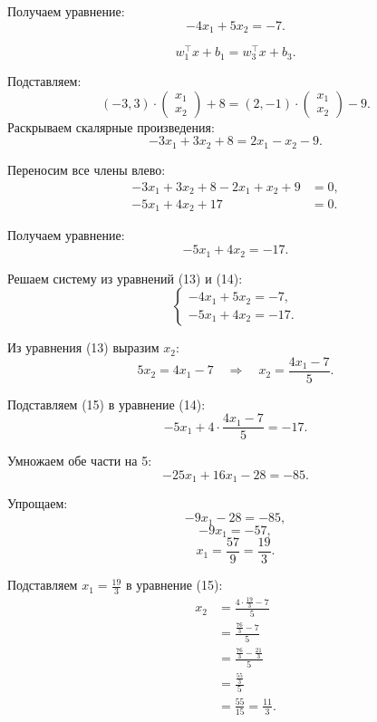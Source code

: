 \documentclass[pract]{SCWorks}
\begin{document}
    Получаем уравнение:
    \begin{equation}
    -4x_1 + 5x_2 = -7.
    \end{equation}

    \[
    w_1^\top x + b_1 = w_3^\top x + b_3.
    \]

    Подставляем:
    \[
    (-3, 3) \cdot \begin{pmatrix} x_1 \\ x_2 \end{pmatrix} + 8 = (2, -1) \cdot \begin{pmatrix} x_1 \\ x_2 \end{pmatrix} - 9.
    \]
    Раскрываем скалярные произведения:
    \[
    -3x_1 + 3x_2 + 8 = 2x_1 - x_2 - 9.
    \]

    Переносим все члены влево:
    \[
    \begin{aligned}
    -3x_1 + 3x_2 + 8 - 2x_1 + x_2 + 9 &= 0, \\
    -5x_1 + 4x_2 + 17 &= 0.
    \end{aligned}
    \]

    Получаем уравнение:
    \begin{equation}
    -5x_1 + 4x_2 = -17.
    \end{equation}

    Решаем систему из уравнений (13) и (14):
    \[
    \begin{cases}
    -4x_1 + 5x_2 = -7, \\
    -5x_1 + 4x_2 = -17.
    \end{cases}
    \]

    Из уравнения (13) выразим $x_2$:
    \begin{equation}
    5x_2 = 4x_1 - 7 \quad \Rightarrow \quad x_2 = \frac{4x_1 - 7}{5}.
    \end{equation}

    Подставляем (15) в уравнение (14):
    \[
    -5x_1 + 4 \cdot \frac{4x_1 - 7}{5} = -17.
    \]

    Умножаем обе части на 5:
    \[
    -25x_1 + 16x_1 - 28 = -85.
    \]

    Упрощаем:
    \[
    -9x_1 - 28 = -85,
    \]
    \[
    -9x_1 = -57,
    \]
    \[
    x_1 = \frac{57}{9} = \frac{19}{3}.
    \]

    Подставляем $x_1 = \frac{19}{3}$ в уравнение (15):
    \[
    \begin{aligned}
    x_2 &= \frac{4 \cdot \frac{19}{3} - 7}{5} \\
    &= \frac{\frac{76}{3} - 7}{5} \\
    &= \frac{\frac{76}{3} - \frac{21}{3}}{5} \\
    &= \frac{\frac{55}{3}}{5} \\
    &= \frac{55}{15} = \frac{11}{3}.
    \end{aligned}
    \]
\end{document}
